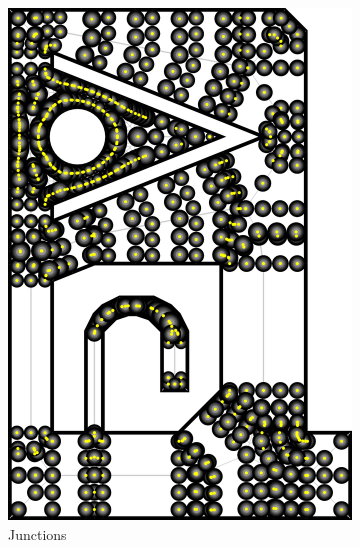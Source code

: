 \begin{figure}
\begin{subfigure}{\figwidth}
\includegraphics[width=\columnwidth]{sources/method/overview/junctions.png}
\caption{Junctions}\label{overview_fig_junctions}
\end{subfigure}
\begin{subfigure}{\figwidth}
\centering

\end{subfigure}
\end{figure}
